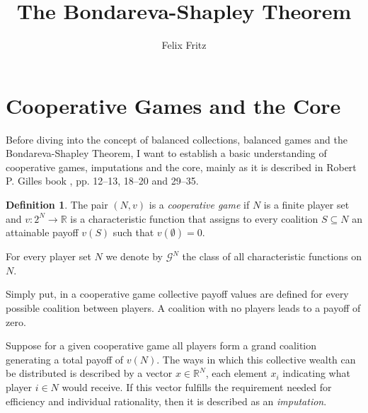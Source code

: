 \documentclass[10pt,a4paper,titlepage]{article}
\author{Felix Fritz}
\title{The Bondareva-Shapley Theorem}
\theoremstyle{plain}
\theoremstyle{definition}
\newtheorem{definition}[thm]{Definition} %
\begin{document}
\maketitle

\tableofcontents
\pagebreak


\section{Cooperative Games and the Core}
Before diving into the concept of balanced collections, balanced games and the Bondareva-Shapley Theorem, I want to establish a basic understanding of cooperative games, imputations and the core, mainly as it is described in Robert P. Gilles book \cite{gilles}, pp. 12--13, 18--20 and 29--35.

\begin{definition}
    The pair $(N, v)$ is a \textit{cooperative game} if $N$ is a finite player set and $v: 2^N \rightarrow \mathbb{R}$ is a characteristic function that assigns to every coalition $S \subseteq N$ an attainable payoff $v(S)$ such that $v(\emptyset) = 0$.
    
    For every player set $N$ we denote by $\mathcal{G}^N$ the class of all characteristic functions on $N$.
\end{definition}
Simply put, in a cooperative game collective payoff values are defined for every possible coalition between players. A coalition with no players leads to a payoff of zero.

Suppose for a given cooperative game all players form a grand coalition generating a total payoff of $v(N)$. The ways in which this collective wealth can be distributed is described by a vector $x \in \mathbb{R}^N$, each element $x_i$ indicating what player $i \in N$ would receive.
If this vector fulfills the requirement needed for efficiency and individual rationality, then it is described as an \textit{imputation}.
\end{document}
